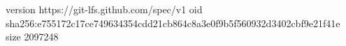 version https://git-lfs.github.com/spec/v1
oid sha256:e755172c17ce749634354cdd21cb864c8a3e0f9b5f560932d3402cbf9e21f41e
size 2097248
